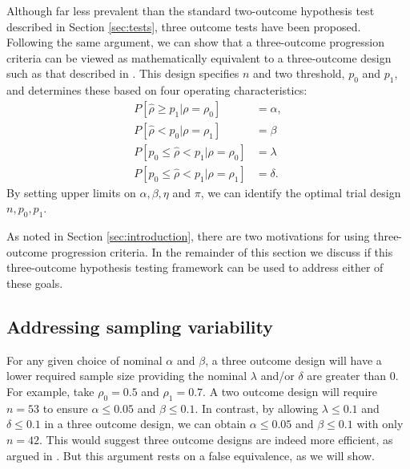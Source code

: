 \documentclass[sagev, Crown]{sagej} %
\begin{document}
Although far less prevalent than the standard two-outcome hypothesis test described in Section \ref{sec:tests}, three outcome tests have been proposed. Following the same argument, we can show that a three-outcome progression criteria can be viewed as mathematically equivalent to a three-outcome design such as that described in \cite{Sargent2001}. This design specifies $n$ and two threshold, $p_0$ and $p_1$, and determines these based on four operating characteristics:
\begin{align}
P[ \hat{\rho} \geq p_1 | \rho = \rho_0] & = \alpha, \\
P[ \hat{\rho} < p_0 | \rho = \rho_1] & = \beta \\
P[ p_0 \leq \hat{\rho} < p_1 | \rho = \rho_0] & = \lambda \\
P[ p_0 \leq \hat{\rho} < p_1 | \rho = \rho_1] & = \delta.
\end{align}
By setting upper limits on $\alpha, \beta, \eta$ and $\pi$, we can identify the optimal trial design $n, p_0, p_1$.

As noted in Section \ref{sec:introduction}, there are two motivations for using three-outcome progression criteria. In the remainder of this section we discuss if this three-outcome hypothesis testing framework can be used to address either of these goals.

\subsection{Addressing sampling variability}

For any given choice of nominal $\alpha$ and $\beta$, a three outcome design will have a lower required sample size providing the nominal $\lambda$ and/or $\delta$ are greater than 0. For example, take $\rho_0 = 0.5$ and $\rho_1 = 0.7$. A two outcome design will require $n = 53$ to ensure $\alpha \leq 0.05$ and $\beta \leq 0.1$. In contrast, by allowing $\lambda \leq 0.1$ and $\delta \leq 0.1$ in a three outcome design, we can obtain $\alpha \leq 0.05$ and $\beta \leq 0.1$ with only $n = 42$. This would suggest three outcome designs are indeed more efficient, as argued in \cite{Hong2007}. But this argument rests on a false equivalence, as we will show.
\end{document}
